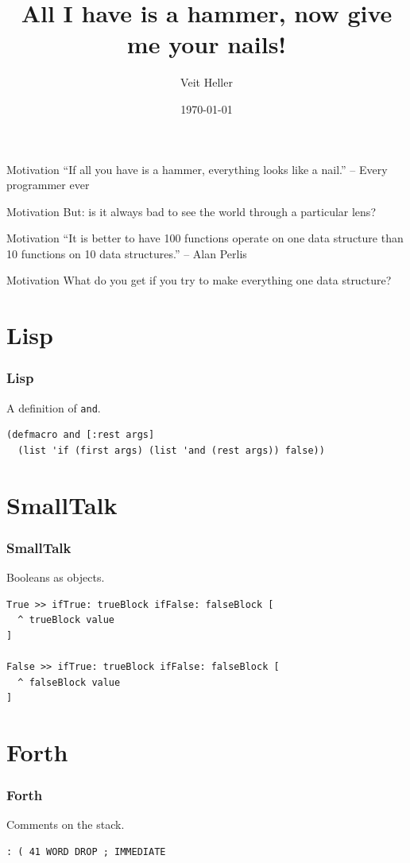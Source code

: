 \documentclass[aspectratio=169]{beamer}
\title{All I have is a hammer, now give me your nails!}
\date{\today}
\author{Veit Heller}
\institute{EnthusiastiCon 2020}
\begin{document}
  \maketitle
  \begin{frame}{Motivation}
    “If all you have is a hammer, everything looks like a nail.” -- Every
    programmer ever
  \end{frame}
  \begin{frame}{Motivation}
    But: is it always bad to see the world through a particular lens?
  \end{frame}
  \begin{frame}{Motivation}
    “It is better to have 100 functions operate on one data structure than 10
    functions on 10 data structures.” -- Alan Perlis
  \end{frame}
  \begin{frame}{Motivation}
    What do you get if you try to make everything one data structure?
  \end{frame}
  \section{Lisp}
  \begin{frame}[fragile]
    \frametitle{Lisp}
    \begin{listing}[H]
      \caption{A definition of \texttt{and}.}
      \begin{verbatim}
(defmacro and [:rest args]
  (list 'if (first args) (list 'and (rest args)) false))
      \end{verbatim}
    \end{listing}
  \end{frame}
  \section{SmallTalk}
  \begin{frame}[fragile]
    \frametitle{SmallTalk}
    \begin{listing}[H]
      \caption{Booleans as objects.}
      \begin{verbatim}
True >> ifTrue: trueBlock ifFalse: falseBlock [
  ^ trueBlock value
]

False >> ifTrue: trueBlock ifFalse: falseBlock [
  ^ falseBlock value
]
      \end{verbatim}
    \end{listing}
  \end{frame}
  \section{Forth}
  \begin{frame}[fragile]
    \frametitle{Forth}
    \begin{listing}[H]
      \caption{Comments on the stack.}
      \begin{verbatim}
: ( 41 WORD DROP ; IMMEDIATE
      \end{verbatim}
    \end{listing}
  \end{frame}
\end{document}
